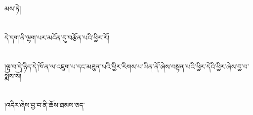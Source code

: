 མས་ཏེ།\chapter{ }དེ་དག་ནི་ལྷག་པར་མངོན་དུ་བརྩོན་པའི་ཕྱིར་རོ།\chapter{ }།ལྟ་བ་དེ་ཉིད་དེ་ཁོ་ན་ལ་འཇུག་པ་དང་མཐུན་པའི་ཕྱིར་རིགས་པ་ཡིན་ནོ་ཞེས་བསྟན་པའི་ཕྱིར་དེའི་ཕྱིར་ཞེས་བྱ་བ་སྨོས་སོ།\chapter{ }།འདིར་ཞེས་བྱ་བ་ནི་ཆོས་ཐམས་ཅད་
